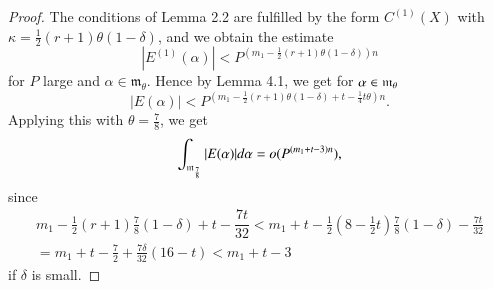 \begin{proof}
The conditions of Lemma 2.2 are fulfilled by the form $C^{(1)} (X)$ with $\kappa = \frac{1}{2} (r+1) \theta (1-\delta)$, and we obtain the estimate
$$
|E^{(1)}(\alpha)| < P^{(m_1 - \frac{1}{2} (r+1) \theta (1-\delta))n}
$$
for $P$ large and $\alpha \in \mathfrak{m}_\theta$. Hence by Lemma 4.1, we get for $\alpha \in \mathfrak{m}_\theta$
$$
|E (\alpha)| < P^{(m_1 - \frac{1}{2} (r+1) \theta (1-\delta)+ t - \frac{1}{4} t \theta) n}.
$$
Applying this with $\theta = \frac{7}{8}$, we get 
$$
\int_{\mathfrak{m}_{\frac{7}{8}}} |E(\alpha)| d \alpha = o (P^{(m_1 + t - 3)n}),
$$
since
\begin{multline*}
m_1 - \frac{1}{2} (r+1) \frac{7}{8} (1-\delta) + t - \dfrac{7t}{32} < m_1 + t - \frac{1}{2} (8-\frac{1}{2}t) \frac{7}{8}(1-\delta) - \frac{7t}{32}\\
= m_1 + t - \frac{7}{2} + \frac{7\delta}{32} (16-t) < m_1 + t - 3
\end{multline*}
if $\delta$ is small.


\end{proof}
